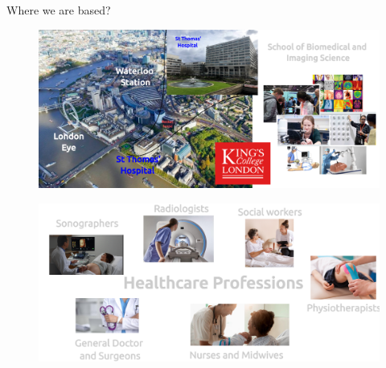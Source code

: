 
{
\begin{frame}{Where we are based?}

  \begin{figure}
  \centering
  \includegraphics[width=1.0\textwidth]{./../figures/where-we-are-based/versions/drawing-v03.png}
  \end{figure}

\end{frame}
}



{
\begin{frame}{}

  \begin{figure}
  \centering
  \includegraphics[width=1.0\textwidth]{./../figures/healthcare-professionals/versions/drawing-v02}
  \end{figure}

\end{frame}
}


